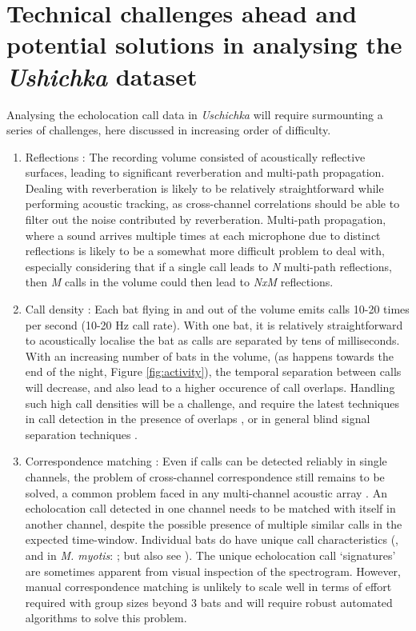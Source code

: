 \documentclass[
]{book}
\begin{document}
\hypertarget{technical-challenges-ahead-and-potential-solutions-in-analysing-the-ushichka-dataset}{%
\section{\texorpdfstring{Technical challenges ahead and potential solutions in analysing the \emph{Ushichka} dataset}{Technical challenges ahead and potential solutions in analysing the Ushichka dataset}}\label{technical-challenges-ahead-and-potential-solutions-in-analysing-the-ushichka-dataset}}

Analysing the echolocation call data in \emph{Uschichka} will require surmounting a series of challenges, here discussed in increasing order of difficulty.

\begin{enumerate}
\def\labelenumi{\arabic{enumi})}
\item
  Reflections : The recording volume consisted of acoustically reflective surfaces, leading to significant reverberation and multi-path propagation. Dealing with reverberation is likely to be relatively straightforward while performing acoustic tracking, as cross-channel correlations should be able to filter out the noise contributed by reverberation. Multi-path propagation, where a sound arrives multiple times at each microphone due to distinct reflections is likely to be a somewhat more difficult problem to deal with, especially considering that if a single call leads to \emph{N} multi-path reflections, then \emph{M} calls in the volume could then lead to \emph{NxM} reflections.
\item
  Call density : Each bat flying in and out of the volume emits calls 10-20 times per second (10-20 Hz call rate). With one bat, it is relatively straightforward to acoustically localise the bat as calls are separated by tens of milliseconds. With an increasing number of bats in the volume, (as happens towards the end of the night, Figure \ref{fig:activity}), the temporal separation between calls will decrease, and also lead to a higher occurence of call overlaps. Handling such high call densities will be a challenge, and require the latest techniques in call detection in the presence of overlaps \citep{izadi2019segmentation}, or in general blind signal separation techniques \citep{brandstein2013microphone}.
\item
  Correspondence matching : Even if calls can be detected reliably in single channels, the problem of cross-channel correspondence still remains to be solved, a common problem faced in any multi-channel acoustic array \citep{brandstein2013microphone}. An echolocation call detected in one channel needs to be matched with itself in another channel, despite the possible presence of multiple similar calls in the expected time-window. Individual bats do have unique call characteristics (\citet{masters1995sonar}, and in \emph{M. myotis}: \citet{yovel-a}; but also see \citet{siemersnovoice}). The unique echolocation call `signatures' are sometimes apparent from visual inspection of the spectrogram. However, manual correspondence matching is unlikely to scale well in terms of effort required with group sizes beyond 3 bats and will require robust automated algorithms to solve this problem.

\end{enumerate}
\end{document}
